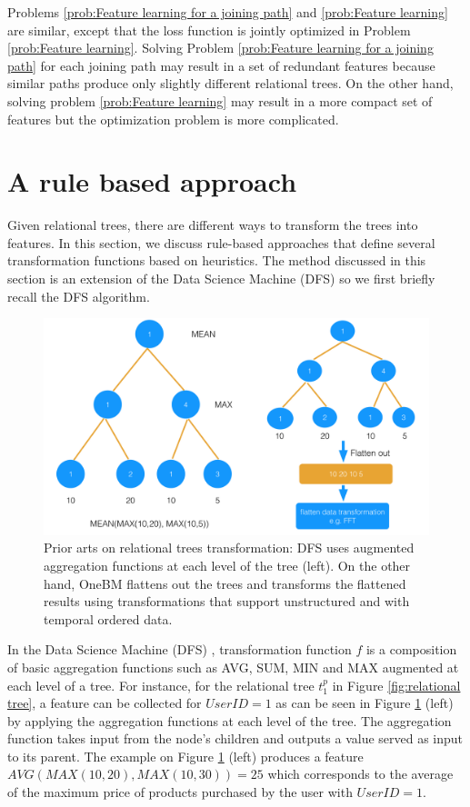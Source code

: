 Problems \ref{prob:Feature learning for a joining path} and \ref{prob:Feature learning} are similar, except that the loss function is jointly optimized in Problem \ref{prob:Feature learning}. Solving Problem \ref{prob:Feature learning for a joining path} for each joining path may result in a set of redundant features because similar paths produce only slightly different relational trees. On the other hand, solving problem \ref{prob:Feature learning} may result in a more compact set of features but the optimization problem is more complicated.


\section{A rule based approach}
Given relational trees, there are different ways to transform the trees into features. In this section, we discuss rule-based approaches that define several transformation functions based on heuristics. The method discussed in this section is an extension of the Data Science Machine (DFS) \cite{DFS} so we first briefly recall the DFS algorithm.

\begin{figure}[tb]
    \centering
    \includegraphics[width=1.0\columnwidth]{./prior_art.png}
    \caption{Prior arts on relational trees transformation: DFS uses augmented aggregation functions at each level of the tree (left). On the other hand, OneBM flattens out the trees and transforms the flattened results using transformations that support unstructured and with temporal ordered data.}
    \label{fig:relational tree transformation prior art}
\end{figure}


In the Data Science Machine (DFS) \cite{DFS}, transformation function $f$ is a composition of basic aggregation functions such as AVG, SUM, MIN and MAX augmented at each level of a tree. For instance, for the relational tree $t^p_1$ in Figure \ref{fig:relational tree}, a feature can be collected for $UserID=1$ as can be seen in Figure \ref{fig:relational tree transformation prior art} (left) by applying the aggregation functions at each level of the tree. The aggregation function takes input from the node's children and outputs a value served as input to its parent. The example on Figure \ref{fig:relational tree transformation prior art} (left) produces a feature $AVG(MAX(10,20),MAX(10,30)) = 25$ which corresponds to the average of the maximum price of products purchased by the user with $UserID=1$. 



